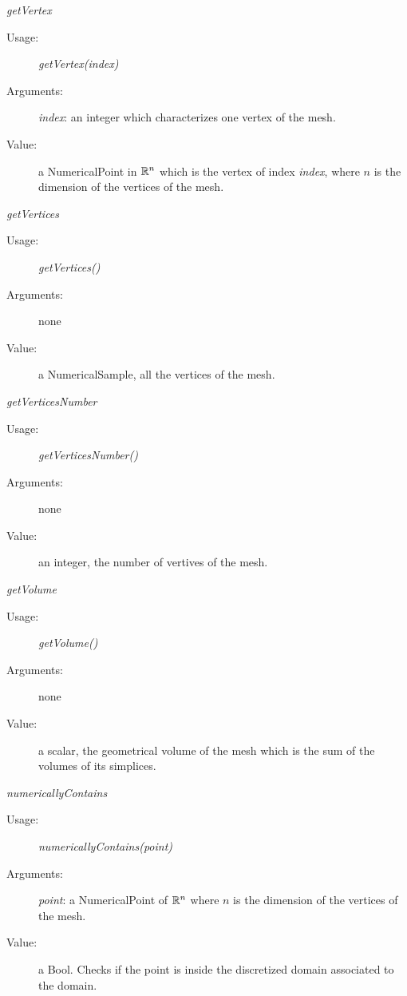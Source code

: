 \begin{description}
\begin{description}
\item \textit{getVertex}
\begin{description}
\item[Usage:]  \textit{getVertex(index)}
\item[Arguments:] \textit{index}: an integer which  characterizes one vertex of the mesh.
\item[Value:] a NumericalPoint in ${\mathbb R}^n$ which is the vertex of index \textit{index}, where $n$ is the dimension of the vertices of the mesh.
\end{description}
\bigskip


\item \textit{getVertices}
\begin{description}
\item[Usage:] \textit{getVertices()}
\item[Arguments:] none
\item[Value:] a NumericalSample, all the vertices of the mesh.
\end{description}
\bigskip

\item \textit{getVerticesNumber}
\begin{description}
\item[Usage:] \textit{getVerticesNumber()}
\item[Arguments:] none
\item[Value:] an integer, the number of vertives of the mesh.
\end{description}
\bigskip

\item \textit{getVolume}
\begin{description}
\item[Usage:] \textit{getVolume()}
\item[Arguments:] none
\item[Value:] a scalar, the geometrical volume of the mesh which is the sum of the volumes of its simplices.
\end{description}
\bigskip


\item \textit{numericallyContains}
\begin{description}
\item[Usage:] \textit{numericallyContains(point)}
\item[Arguments:] \textit{point}: a NumericalPoint of ${\mathbb R}^n$ where $n$ is the dimension of the vertices of the mesh.
\item[Value:] a Bool. Checks if the point is inside the discretized domain associated to the domain.
\end{description}




\end{description}
\end{description}
